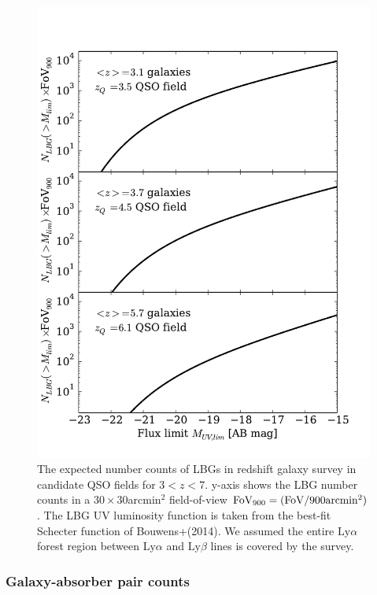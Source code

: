 \documentclass[useAMS,usenatbib,twocolumn]{mn2e}
\newcommand{\LyA}{\mbox{Ly}\alpha}
\begin{document}
\begin{figure}
 \begin{center}
  \includegraphics[angle=0,width=\columnwidth]{figure/LBG_number_counts.pdf}
  \caption{The expected number counts of LBGs in redshift galaxy survey in candidate QSO fields
    for $3<z<7$. y-axis shows the LBG number counts in a $30\times30$arcmin$^2$ field-of-view 
    $\rm{FoV_{900}=(FoV/900arcmin^2)}$. The LBG UV luminosity function is taken from the best-fit 
    Schecter function of Bouwens+(2014). We assumed the entire $\LyA$ forest region between 
     $\LyA$ and $\mbox{Ly}\beta$ lines is covered by the survey. }
 \end{center}
\end{figure}

\subsubsection{Galaxy-absorber pair counts}
\end{document}

